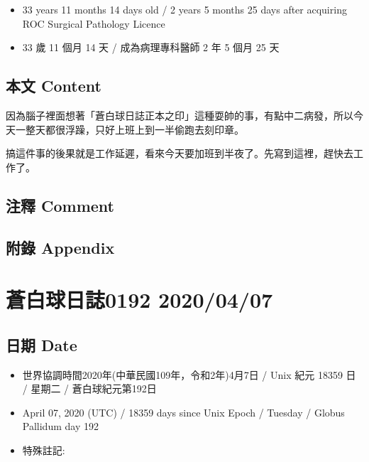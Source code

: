 \documentclass[a5paper, 11pt
]{book}
\providecommand{\tightlist}{%
  \setlength{\itemsep}{0pt}\setlength{\parskip}{0pt}}
\begin{document}
\begin{itemize}
\tightlist
\item
  33 years 11 months 14 days old / 2 years 5 months 25 days after
  acquiring ROC Surgical Pathology Licence
\item
  33 歲 11 個月 14 天 / 成為病理專科醫師 2 年 5 個月 25 天
\end{itemize}

\hypertarget{ux672cux6587-content-36}{%
\subsection{本文 Content}\label{ux672cux6587-content-36}}

因為腦子裡面想著「蒼白球日誌正本之印」這種耍帥的事，有點中二病發，所以今天一整天都很浮躁，只好上班上到一半偷跑去刻印章。

搞這件事的後果就是工作延遲，看來今天要加班到半夜了。先寫到這裡，趕快去工作了。

\hypertarget{ux6ce8ux91cb-comment-36}{%
\subsection{注釋 Comment}\label{ux6ce8ux91cb-comment-36}}

\hypertarget{ux9644ux9304-appendix-36}{%
\subsection{附錄 Appendix}\label{ux9644ux9304-appendix-36}}

\hypertarget{ux84bcux767dux7403ux65e5ux8a8c0192-20200407}{%
\section{蒼白球日誌0192
2020/04/07}\label{ux84bcux767dux7403ux65e5ux8a8c0192-20200407}}

\hypertarget{ux65e5ux671f-date-37}{%
\subsection{日期 Date}\label{ux65e5ux671f-date-37}}

\begin{itemize}
\tightlist
\item
  世界協調時間2020年(中華民國109年，令和2年)4月7日 / Unix 紀元 18359 日
  / 星期二 / 蒼白球紀元第192日
\item
  April 07, 2020 (UTC) / 18359 days since Unix Epoch / Tuesday / Globus
  Pallidum day 192
\item
  特殊註記:
\end{itemize}
\end{document}

